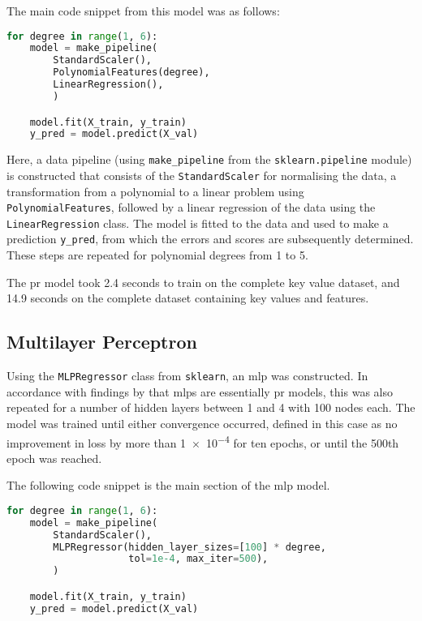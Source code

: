 The main code snippet from this model was as follows:

\begin{lstlisting}[language=Python]
for degree in range(1, 6):
    model = make_pipeline(
        StandardScaler(),
        PolynomialFeatures(degree),
        LinearRegression(),
        )

    model.fit(X_train, y_train)
    y_pred = model.predict(X_val)
\end{lstlisting}

Here, a data pipeline (using \texttt{make\_pipeline} from the \texttt{sklearn.pipeline} module) is constructed that consists of the \texttt{StandardScaler} for normalising the data, a transformation from a polynomial to a linear problem using \texttt{PolynomialFeatures}, followed by a linear regression of the data using the \texttt{LinearRegression} class. The model is fitted to the data and used to make a prediction \texttt{y\_pred}, from which the errors and scores are subsequently determined. These steps are repeated for polynomial degrees from 1 to 5.

The \ac{pr} model took 2.4 seconds to train on the complete key value dataset, and 14.9 seconds on the complete dataset containing key values and features.

\subsection{Multilayer Perceptron}
Using the \texttt{MLPRegressor} class from \texttt{sklearn}, an \ac{mlp} was constructed. In accordance with findings by \citet{cheng_polynomial_2019} that \ac{mlp}s are essentially \ac{pr} models, this was also repeated for a number of hidden layers between 1 and 4 with 100 nodes each. The model was trained until either convergence occurred, defined in this case as no improvement in loss by more than \num{1e-4} for ten epochs, or until the 500th epoch was reached.

The following code snippet is the main section of the \ac{mlp} model.

\begin{lstlisting}[language=Python]
for degree in range(1, 6):
    model = make_pipeline(
        StandardScaler(),
        MLPRegressor(hidden_layer_sizes=[100] * degree,
                     tol=1e-4, max_iter=500),
        )

    model.fit(X_train, y_train)
    y_pred = model.predict(X_val)
\end{lstlisting}


